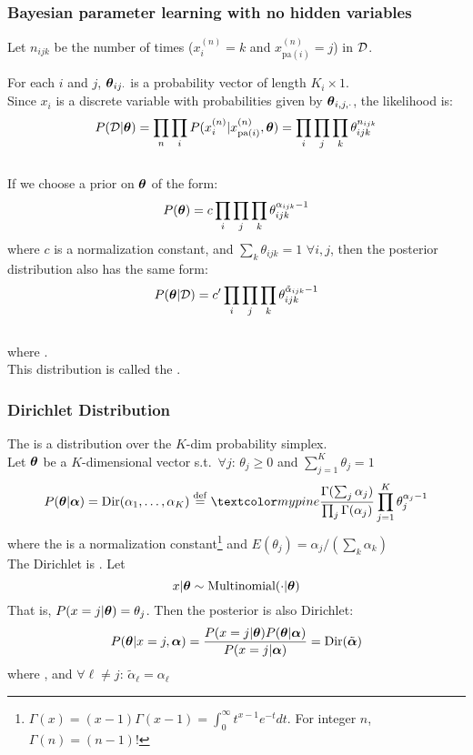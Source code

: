 \begin{frame}
\frametitle{Bayesian parameter learning with {\bf no} hidden variables}

Let $n_{ijk}$ be the number of times ($x^{(n)}_i = k$ and
$x^{(n)}_{\mathrm{pa}(i)} = j$) in $\mathcal{D}$.

For each $i$ and $j$, $\boldsymbol{\theta}_{ij\cdot}$ is a probability vector of
length $K_i \times 1$. \\

Since $x_i$ is a discrete variable with probabilities given by
$\boldsymbol{\theta}_{i,j,\cdot}$, the likelihood is: 
\[
P(\mathcal{D}|\boldsymbol{\theta}) = \prod_n \prod_i P(x_i^{(n)}|x_{\mathrm{pa}(i)}^{(n)}, \boldsymbol{\theta}) =
\prod_i \prod_j \prod_k \theta_{ijk}^{n_{ijk}}
\] \\[-1ex]
If we choose a prior on $\boldsymbol{\theta}$ of the form: \vspace*{-1ex}
\[
P(\boldsymbol{\theta}) = c \prod_i \prod_j \prod_k
\theta_{ijk}^{\alpha_{ijk}-1}
\]
where $c$ is a normalization constant, and $\sum_k \theta_{ijk}=1$
$\forall i, j $, then the posterior distribution also has the same
form:
\[
P(\boldsymbol{\theta}|\mathcal{D}) =  c' \prod_i \prod_j \prod_k
\theta_{ijk}^{\tilde{\alpha}_{ijk}-1}
\] \\[-2ex]
where . \\[1ex]

This distribution is called the .

\end{frame}
\begin{frame}
\frametitle{Dirichlet Distribution}

The  is a distribution over the
$K$-dim probability simplex.\\

Let $\boldsymbol{\theta}$ be a $K$-dimensional vector s.t.\ $\forall j :\,
\theta_j \ge 0$ and 
$\sum_{j=1}^K \theta_j  = 1$
\[
P(\btheta|\balpha) = \mbox{Dir}(\alpha_1, \ldots, \alpha_K) \deff
\PineGreen{\frac{\Gamma(\sum_j \alpha_j)}{\prod_j \Gamma(\alpha_j)}}
\prod_{j=1}^K \theta_j^{\alpha_j - 1} 
\]
where the  is a normalization
constant\footnote{$\Gamma(x) = (x-1) \Gamma(x-1) = \int_0^\infty
t^{x-1} e^{-t} dt$. For integer $n$, $\Gamma(n)=(n-1)!$} and $E(\theta_j) =
\alpha_j / (\sum_k \alpha_k)$\\

The Dirichlet is . Let 
\vspace*{-1ex}
\[
x| \boldsymbol{\theta} \sim \mbox{Multinomial}(\cdot|\boldsymbol{\theta})
\]
That is,  $P(x=j|\boldsymbol{\theta}) = \theta_j$. Then the posterior is also
Dirichlet:\vspace*{-1ex} 
\[
P(\boldsymbol{\theta}|x=j,\boldsymbol{\alpha}) = \frac{P(x=j|\boldsymbol{\theta})P(\boldsymbol{\theta}|\boldsymbol{\alpha})}{P(x=j|\boldsymbol{\alpha})} = \mbox{Dir}(\tilde{\boldsymbol{\alpha}})
\]
where , and $\forall \ell \neq j : \,
\tilde{\alpha}_\ell = \alpha_\ell$

\end{frame}
